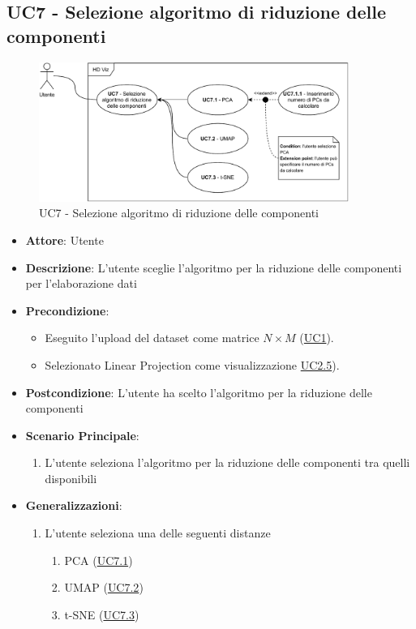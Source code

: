 \subsection{UC7 - Selezione algoritmo di riduzione delle componenti}
    \label{uc7}
    
    \begin{figure}[htbp]
        \centering
        \includegraphics[width=0.9\textwidth]{source/sections/casi-uso/diagrams/uc7.pdf}
        \caption{UC7 - Selezione algoritmo di riduzione delle componenti}
        \label{fig:uc7}
    \end{figure}
    
    \begin{itemize}
    \item \textbf{Attore}: Utente
    \item \textbf{Descrizione}: L'utente sceglie l'algoritmo per la riduzione delle componenti per l'elaborazione dati
    \item \textbf{Precondizione}: 
    \begin{itemize}
        \item Eseguito l'upload del dataset come matrice $N\times M$ (\hyperref[uc1]{UC1}).
        \item Selezionato Linear Projection come visualizzazione \hyperref[uc2.5]{UC2.5}).
    \end{itemize}  
    \item \textbf{Postcondizione}: L'utente ha scelto l'algoritmo per la riduzione delle componenti
    \item \textbf{Scenario Principale}: 
    \begin{enumerate}
        \item L'utente seleziona l'algoritmo per la riduzione delle componenti tra quelli disponibili
    \end{enumerate}
    \item \textbf{Generalizzazioni}:
        \begin{enumerate}
            \item L'utente seleziona una delle seguenti distanze
                \begin{enumerate}
                    \item PCA (\hyperref[uc7.1]{UC7.1})
                    \item UMAP (\hyperref[uc7.2]{UC7.2})
                    \item t-SNE (\hyperref[uc7.3]{UC7.3})
                \end{enumerate}
        \end{enumerate}  
    \end{itemize}
    
